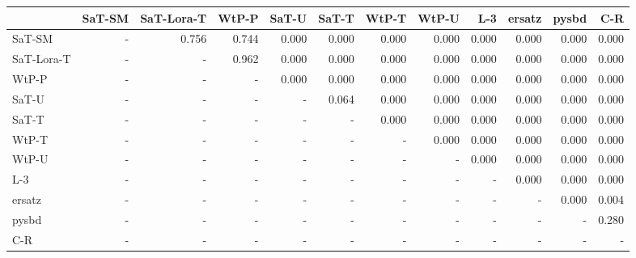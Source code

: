 \begin{tabular}{lrrrrrrrrrrr}
\toprule
 & SaT-SM & SaT-Lora-T & WtP-P & SaT-U & SaT-T & WtP-T & WtP-U & L-3 & ersatz & pysbd & C-R \\
\midrule
SaT-SM & - & 0.756 & 0.744 & 0.000 & 0.000 & 0.000 & 0.000 & 0.000 & 0.000 & 0.000 & 0.000 \\
SaT-Lora-T & - & - & 0.962 & 0.000 & 0.000 & 0.000 & 0.000 & 0.000 & 0.000 & 0.000 & 0.000 \\
WtP-P & - & - & - & 0.000 & 0.000 & 0.000 & 0.000 & 0.000 & 0.000 & 0.000 & 0.000 \\
SaT-U & - & - & - & - & 0.064 & 0.000 & 0.000 & 0.000 & 0.000 & 0.000 & 0.000 \\
SaT-T & - & - & - & - & - & 0.000 & 0.000 & 0.000 & 0.000 & 0.000 & 0.000 \\
WtP-T & - & - & - & - & - & - & 0.000 & 0.000 & 0.000 & 0.000 & 0.000 \\
WtP-U & - & - & - & - & - & - & - & 0.000 & 0.000 & 0.000 & 0.000 \\
L-3 & - & - & - & - & - & - & - & - & 0.000 & 0.000 & 0.000 \\
ersatz & - & - & - & - & - & - & - & - & - & 0.000 & 0.004 \\
pysbd & - & - & - & - & - & - & - & - & - & - & 0.280 \\
C-R & - & - & - & - & - & - & - & - & - & - & - \\
\bottomrule
\end{tabular}

